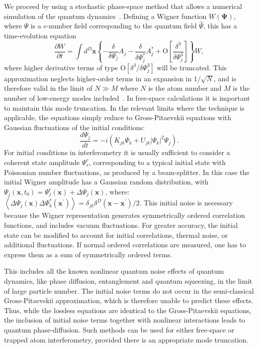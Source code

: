 \documentclass[aps,prl,twocolumn,showpacs,amsmath,amssymb,superscriptaddress,flushbottom,noraggedfooter]{revtex4-1}
\newcommand{\xvec}{\boldsymbol{x}}
\newcommand{\Psivec}{\boldsymbol{\Psi}}
\begin{document}
We proceed by using a stochastic phase-space method that allows a numerical
simulation of the quantum dynamics~\cite{Drummond1993,Steel1998,Hoffmann2008}.
Defining a Wigner function $W(\Psivec)$, where $\Psi$
is a c-number field corresponding to the quantum field $\hat{\Psi}$, this has a time-evolution equation
\begin{equation}
	\frac{\partial W}{\partial t} = \int d^D\xvec \left\{
		- \frac{\delta}{\delta\Psi_j} A_j
		- \frac{\delta}{\delta\Psi_j^*}A_j^*
		+ \mbox{O} \left[ \frac{\delta^3}{\delta\Psi_j^3} \right]
	\right\} W,
\end{equation}
where higher derivative terms of type $\mbox{O} \left[ \delta^3 / \delta\Psi_j^3 \right]$ will be truncated.
This approximation neglects higher-order terms in an expansion in $1 / \sqrt{N}$,
and is therefore valid in the limit of $N \gg M$
where $N$ is the atom number and $M$ is the number of low-energy modes included~\cite{Drummond1993,Sinatra2002,Norrie2006}.
In free-space calculations it is important to maintain this mode truncation.
In the relevant limits where the technique is applicable, the equations
simply reduce to Gross-Pitaevskii equations with Gaussian fluctuations
of the initial conditions:
\begin{equation}
\label{eqn:SDE-1}
	\frac{d\Psi_j}{dt} = -i \left(
		K_{jk} \Psi_k + U_{jk} \lvert \Psi_k \rvert^2 \Psi_j
	\right).
\end{equation}
For initial conditions in interferometry it is usually sufficient to consider
a coherent state amplitude $\Psi_s^c$,
corresponding to a typical initial state with Poissonian number fluctuations,
as produced by a beam-splitter.
In this case the initial Wigner amplitude has a Gaussian random distribution, with
$\Psi_j(\xvec, t_0) = \Psi_j^c(\xvec) + \Delta \Psi_j(\xvec)$, where:
$\left\langle \Delta \Psi_j(\xvec) \Delta \Psi_k^*(\xvec^{\prime}) \right\rangle =
\delta_{jk} \delta^D(\xvec - \xvec^{\prime}) / 2.$
This initial noise is necessary because the Wigner representation generates
symmetrically ordered correlation functions, and includes vacuum fluctuations.
For greater accuracy, the initial state can be modified to account for
initial  correlations, thermal noise, or additional fluctuations.
If normal ordered correlations are measured, one has to express them
as a sum of symmetrically ordered terms.

This includes all the known nonlinear quantum noise effects of quantum dynamics,
like phase diffusion, entanglement and quantum squeezing, in the limit
of large particle number.
The initial noise terms do not occur in the semi-classical Gross-Pitaevskii
approximation, which is therefore unable to predict these effects.
Thus, while the lossless equations are identical to the Gross-Pitaevskii
equations, the inclusion of initial noise terms together with nonlinear
interactions leads to quantum phase-diffusion.
Such methods can be used for either free-space or trapped atom interferometry,
provided there is an appropriate mode truncation.
\end{document}
